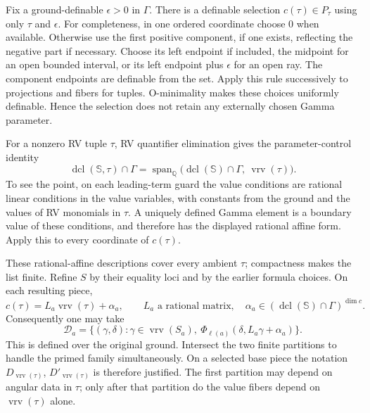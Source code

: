 \documentclass[12pt]{amsart}
\theoremstyle{remark}
\theoremstyle{definition}
\newcommand{\Q}{\mathds{Q}}
\newcommand{\vrv}{\operatorname{vrv}}
\newcommand{\dcl}{\operatorname{dcl}}
\newcommand{\Sbase}{\mathbb S}
\numberwithin{equation}{section}
\theoremstyle{plain}
\begin{document}
{Fix a ground-definable $\epsilon>0$ in $\Gamma$.
There is a definable selection $c(\tau)\in P_\tau$ using
only $\tau$ and $\epsilon$.
For completeness, in one ordered coordinate choose $0$
when available. Otherwise use the first positive component,
if one exists, reflecting the negative part if necessary.
Choose its left endpoint if included, the midpoint for an
open bounded interval, or its left endpoint plus $\epsilon$
for an open ray. The component endpoints are definable
from the set. Apply this rule successively to projections
and fibers for tuples. O-minimality makes these choices
uniformly definable. Hence the selection does not retain
any externally chosen Gamma parameter.

For a nonzero RV tuple $\tau$, RV quantifier elimination
gives the parameter-control identity
\[
 \dcl(\Sbase,\tau)\cap\Gamma
 =
 \operatorname{span}_{\Q}
 \bigl(\dcl(\Sbase)\cap\Gamma,\ \vrv(\tau)\bigr).
\]
To see the point, on each leading-term guard the value
conditions are rational linear conditions in the value
variables, with constants from the ground and the values
of RV monomials in $\tau$.
A uniquely defined Gamma element is a boundary value of
these conditions, and therefore has the displayed rational
affine form.
Apply this to every coordinate of $c(\tau)$.

These rational-affine descriptions cover every ambient
$\tau$; compactness makes the list finite.
Refine $S$ by their equality loci and by the earlier formula
choices. On each resulting piece,
\[
 c(\tau)=L_a\vrv(\tau)+\alpha_a,
 \qquad L_a\text{ a rational matrix},\quad
 \alpha_a\in(\dcl(\Sbase)\cap\Gamma)^{\dim c}.
\]
Consequently one may take
\[
 \mathcal D_a=
 \{(\gamma,\delta):\gamma\in\vrv(S_a),\
             \Phi_{\ell(a)}(\delta,L_a\gamma+\alpha_a)\}.
\]
This is defined over the original ground.
Intersect the two finite partitions to handle the primed
family simultaneously.
On a selected base piece the notation
$D_{\vrv(\tau)}$, $D'_{\vrv(\tau)}$ is therefore justified.
The first partition may depend on angular data in $\tau$;
only after that partition do the value fibers depend on
$\vrv(\tau)$ alone.
}
\end{document}
